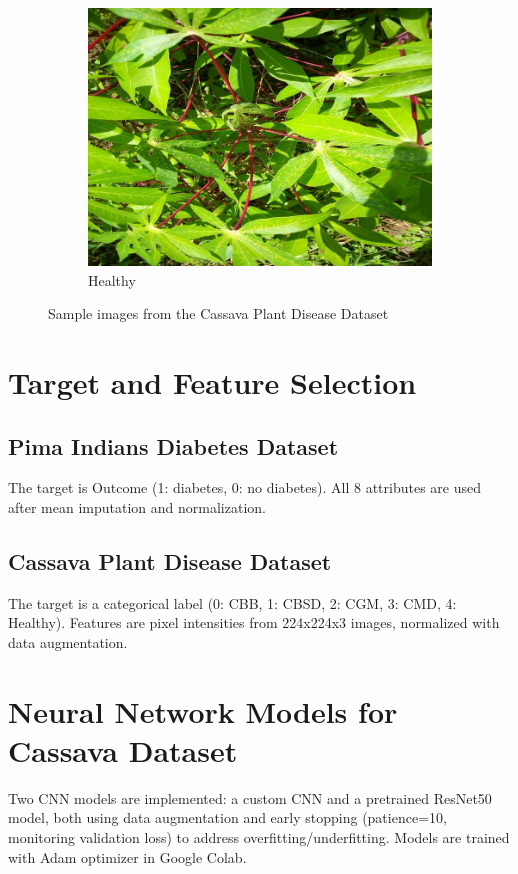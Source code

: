 \documentclass[a4paper,12pt]{article}
\begin{document}
\begin{figure}[H]
    \centering
    \begin{subfigure}{0.45\textwidth}
        \centering
        \includegraphics[width=\textwidth]{./assets/class_images/class_4.jpg}
        \caption{Healthy}
    \end{subfigure}
    \caption{Sample images from the Cassava Plant Disease Dataset}
\end{figure}

\section*{Target and Feature Selection}

\subsection*{Pima Indians Diabetes Dataset}
The target is Outcome (1: diabetes, 0: no diabetes). All 8 attributes are used after mean imputation and normalization.

\subsection*{Cassava Plant Disease Dataset}
The target is a categorical label (0: CBB, 1: CBSD, 2: CGM, 3: CMD, 4: Healthy). Features are pixel intensities from 224x224x3 images, normalized with data augmentation.


\section*{Neural Network Models for Cassava Dataset}
Two CNN models are implemented: a custom CNN and a pretrained ResNet50 model, both using data augmentation and early stopping (patience=10, monitoring validation loss) to address overfitting/underfitting. Models are trained with Adam optimizer in Google Colab.
\end{document}

